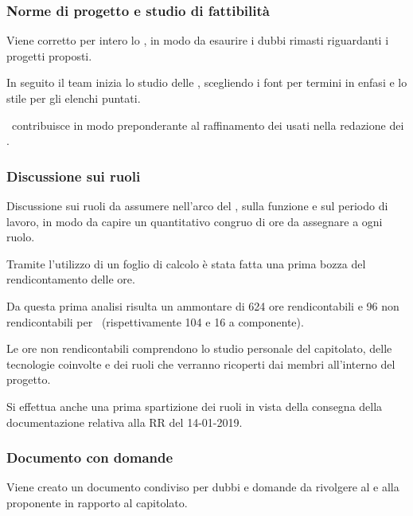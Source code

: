             \subsubsection{Norme di progetto e studio di fattibilità}
            Viene corretto per intero lo \SdF, in modo da esaurire i dubbi rimasti riguardanti i progetti proposti.\par
            In seguito il team inizia lo studio delle \NdP, scegliendo i font per termini in enfasi e lo stile per gli elenchi puntati.\par
            \TG\ contribuisce in modo preponderante al raffinamento dei  usati nella redazione dei .

            \subsubsection{Discussione sui ruoli}
            Discussione sui ruoli da assumere nell'arco del , sulla funzione e sul periodo di lavoro, in modo da capire un quantitativo congruo di ore da assegnare a ogni ruolo.\par
            Tramite l'utilizzo di un foglio di calcolo è stata fatta una prima bozza del rendicontamento delle ore.\par
Da questa prima analisi risulta un ammontare di 624 ore rendicontabili e 96 non rendicontabili per \gruppo\ (rispettivamente 104 e 16 a componente).\par
Le ore non rendicontabili comprendono lo studio personale del capitolato, delle tecnologie coinvolte e dei ruoli che verranno ricoperti dai membri all'interno del progetto.\par
Si effettua anche una prima spartizione dei ruoli in vista della consegna della documentazione relativa alla RR del 14-01-2019.\par

            \subsubsection{Documento con domande}
            Viene creato un documento condiviso per dubbi e domande da rivolgere al {\TV} e alla proponente {\II} in rapporto al capitolato.\par


